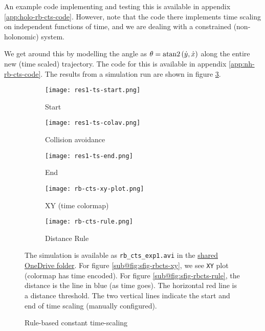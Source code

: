 An example code implementing and testing this is available in appendix \ref{app:holo-rb-cts-code}. However, note that the code there implements time scaling on independent functions of time, and we are dealing with a constrained (non-holonomic) system.

We get around this by modelling the angle as $\theta = \textup{atan2} \left ( \dot{y},\dot{x} \right )$ along the entire new (time scaled) trajectory. The code for this is available in appendix \ref{app:nh-rb-cts-code}. The results from a simulation run are shown in figure \ref{fig:rb-cts-exp1}.

\begin{figure}[ht]
    \centering
    \begin{subfigure}[b]{0.3\textwidth}
        \texttt{[image: res1-ts-start.png]}
        \caption{Start}
    \end{subfigure}
    \begin{subfigure}[b]{0.3\textwidth}
        \texttt{[image: res1-ts-colav.png]}
        \caption{Collision avoidance}
    \end{subfigure}
    \begin{subfigure}[b]{0.3\textwidth}
        \texttt{[image: res1-ts-end.png]}
        \caption{End}
    \end{subfigure}
    \begin{subfigure}[b]{0.45\textwidth}
        \texttt{[image: rb-cts-xy-plot.png]}
        \caption{XY (time colormap)}
        \label{fig:sfig-rbcts-xy}
    \end{subfigure}
    \begin{subfigure}[b]{0.45\textwidth}
        \texttt{[image: rb-cts-rule.png]}
        \caption{Distance Rule}
        \label{fig:sfig-rbcts-rule}
    \end{subfigure}
    \caption{Rule-based constant time-scaling}
    \label{fig:rb-cts-exp1}
    The simulation is available as \texttt{rb\_cts\_exp1.avi} in the \href{https://iiitaphyd-my.sharepoint.com/:f:/g/personal/avneesh_mishra_research_iiit_ac_in/Er_wRqK4hxVLjVdL56rfDxYBKr9PPed1laN48hLgLisf4w}{shared OneDrive folder}. For figure \ref{sub@fig:sfig-rbcts-xy}, we see \texttt{XY} plot (colormap has time encoded). For figure \ref{sub@fig:sfig-rbcts-rule}, the distance is the line in blue (as time goes). The horizontal red line is a distance threshold. The two vertical lines indicate the start and end of time scaling (manually configured).
\end{figure}

